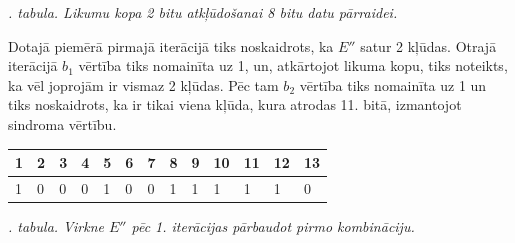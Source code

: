 \documentclass[12pt, a4paper, oneside, openright]{article}
\renewcommand{\thectables}{\arabic{ctables}}
\begin{document}
\begin{samepage}
\begin{table}[h]
\begin{tabular}{|l|l|l|l|}
\end{tabular}
\end{table}
\label{ctables:hamming_1}
\begin{center}
\footnotesize{
\textit{\thectables. tabula. Likumu kopa 2 bitu atkļūdošanai 8 bitu datu pārraidei.}}
\end{center}
\end{samepage}

\par
Dotajā piemērā pirmajā iterācijā tiks noskaidrots, ka $E''$ satur 2 kļūdas. Otrajā iterācijā
$b_1$ vērtība tiks nomainīta uz 1, un, atkārtojot likuma kopu, tiks noteikts, ka vēl joprojām ir vismaz 2
kļūdas. Pēc tam $b_2$ vērtība tiks nomainīta uz 1 un tiks noskaidrots, ka ir tikai viena kļūda,
kura atrodas 11. bitā, izmantojot sindroma vērtību.

\begin{samepage}
\begin{table}[h]
\centering
\begin{tabular}{|l|l|l|l|l|l|l|l|l|l|l|l|l|}
\hline
1                         & 2                         & 3 & 4                         & 5 & 6 & 7 & 8                         & 9 & 10 & 11                        & 12 & 13                        \\ \hline
\cellcolor[HTML]{9AFF99}1 & \cellcolor[HTML]{9AFF99}0 & 0 & \cellcolor[HTML]{FFFFC7}0 & 1 & 0 & 0 & \cellcolor[HTML]{FFFFC7}1 & 1 & 1  & \cellcolor[HTML]{FFCCC9}1 & 1  & \cellcolor[HTML]{ECF4FF}0 \\ \hline
\end{tabular}
\end{table}
\label{ctables:hamming_1}
\begin{center}
\footnotesize{
\textit{\thectables. tabula. Virkne $E''$ pēc 1. iterācijas pārbaudot pirmo kombināciju.}}
\end{center}
\end{samepage}


\newpage
\end{document}
